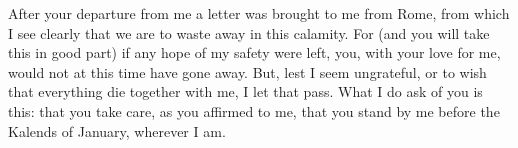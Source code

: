 

 After your departure from me a letter was brought to me from Rome, from which I see clearly that we are to waste away in this calamity. For (and you will take this in good part) if any hope of my safety were left, you, with your love for me, would not at this time have gone away. But, lest I seem ungrateful, or to wish that everything die together with me, I let that pass. What I do ask of you is this: that you take care, as you affirmed to me, that you stand by me before the Kalends of January, wherever I am.
